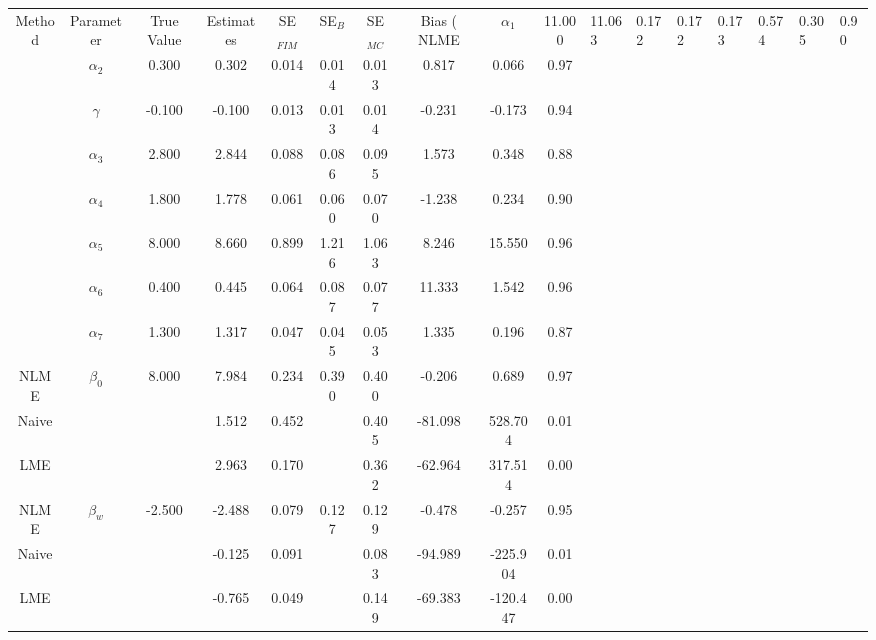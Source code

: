 \begin{table}[ht]
\centering
\begin{tabular}{cccccccccc}
  \hline
Method & Parameter & True Value & Estimates & SE$_{FIM}$ & SE$_{B}$ & SE$_{MC}$ & Bias (%
  \hline
NLME & $\alpha_1$ & 11.000 & 11.063 & 0.172 & 0.172 & 0.173 & 0.574 & 0.305 & 0.90 \\ 
   & $\alpha_2$ & 0.300 & 0.302 & 0.014 & 0.014 & 0.013 & 0.817 & 0.066 & 0.97 \\ 
   & $\gamma$ & -0.100 & -0.100 & 0.013 & 0.013 & 0.014 & -0.231 & -0.173 & 0.94 \\ 
   & $\alpha_3$ & 2.800 & 2.844 & 0.088 & 0.086 & 0.095 & 1.573 & 0.348 & 0.88 \\ 
   & $\alpha_4$ & 1.800 & 1.778 & 0.061 & 0.060 & 0.070 & -1.238 & 0.234 & 0.90 \\ 
   & $\alpha_5$ & 8.000 & 8.660 & 0.899 & 1.216 & 1.063 & 8.246 & 15.550 & 0.96 \\ 
   & $\alpha_6$ & 0.400 & 0.445 & 0.064 & 0.087 & 0.077 & 11.333 & 1.542 & 0.96 \\ 
 & $\alpha_7$ & 1.300 & 1.317 & 0.047 & 0.045 & 0.053 & 1.335 & 0.196 & 0.87 \\ 
 \hline
  NLME & $\beta_0$ & 8.000 & 7.984 & 0.234 & 0.390 & 0.400 & -0.206 & 0.689 & 0.97 \\ 
  Naive &  &  & 1.512 & 0.452 &  & 0.405 & -81.098 & 528.704 & 0.01 \\ 
  LME &  &  & 2.963 & 0.170 &  & 0.362 & -62.964 & 317.514 & 0.00 \\ 
  NLME & $\beta_w$ & -2.500 & -2.488 & 0.079 & 0.127 & 0.129 & -0.478 & -0.257 & 0.95 \\ 
  Naive &  &  & -0.125 & 0.091 &  & 0.083 & -94.989 & -225.904 & 0.01 \\ 
  LME &  &  & -0.765 & 0.049 &  & 0.149 & -69.383 & -120.447 & 0.00 \\ 
   \hline
\end{tabular}
\end{table}
